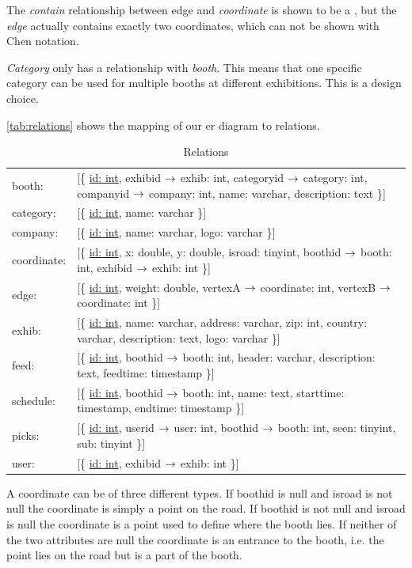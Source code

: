 The \textit{contain} relationship between edge and \textit{coordinate} is shown to be a , but the \textit{edge} actually contains exactly two coordinates, which can not be shown with Chen notation.

\textit{Category} only has a relationship with \textit{booth}. This means that one specific category can be used for multiple booths at different exhibitions. This is a design choice.

\autoref{tab:relations} shows the mapping of our \ac{er} diagram to relations.

\newcommand{\relation}[1]{[\{ #1 \}]\\}

\begin{table}[H]
\centering
\small
\begin{tabular}{p{1.2cm} p{9.6cm}}
booth: & \relation{\underline{id: int}, exhibid $\rightarrow$ exhib: int, categoryid $\rightarrow$ category: int, companyid $\rightarrow$ company: int, name: varchar, description: text}
category: & \relation{\underline{id: int}, name: varchar}
company: & \relation{\underline{id: int}, name: varchar, logo: varchar}
coordinate: & \relation{\underline{id: int}, x: double, y: double, isroad: tinyint, boothid $\rightarrow$ booth: int, exhibid $\rightarrow$ exhib: int}
edge: & \relation{\underline{id: int}, weight: double, vertexA $\rightarrow$ coordinate: int, vertexB $\rightarrow$ coordinate: int}
exhib: & \relation{\underline{id: int}, name: varchar, address: varchar, zip: int, country: varchar, description: text, logo: varchar}
feed: & \relation{\underline{id: int}, boothid $\rightarrow$ booth: int, header: varchar, description: text, feedtime: timestamp}
schedule: & \relation{\underline{id: int}, boothid $\rightarrow$ booth: int, name: text, starttime: timestamp, endtime: timestamp}
picks: & \relation{\underline{id: int}, userid $\rightarrow$ user: int, boothid $\rightarrow$ booth: int, seen: tinyint, sub: tinyint}
user: & \relation{\underline{id: int}, exhibid $\rightarrow$ exhib: int}
\end{tabular}
\caption{Relations}
\label{tab:relations}
\end{table}
A coordinate can be of three different types. If boothid is null and isroad is not null the coordinate is simply a point on the road. If boothid is not null and isroad is null the coordinate is a point used to define where the booth lies. If neither of the two attributes are null the coordinate is an entrance to the booth, i.e. the point lies on the road but is a part of the booth.
